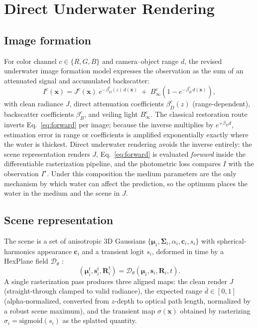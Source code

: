 \documentclass[11pt,a4paper]{article}
\newcommand{\Binf}{B_\infty}
\newcommand{\J}{J}
\newcommand{\I}{I}
\begin{document}
\section{Direct Underwater Rendering}
\label{sec:dur}

\subsection{Image formation}

For color channel $c \in \{R,G,B\}$ and camera--object range $d$, the revised underwater image formation model \cite{akkaynak2018revised} expresses the observation as the sum of an attenuated signal and accumulated backscatter:
\begin{equation}
    \I^c(\mathbf{x})
    =
    \J^c(\mathbf{x})\; e^{-\beta_D^c(z)\, d(\mathbf{x})}
    \;+\;
    \Binf^c \left(1-e^{-\beta_B^c\, d(\mathbf{x})}\right),
    \label{eq:forward}
\end{equation}
with clean radiance $\J$, direct attenuation coefficients $\beta_D^c(z)$ (range-dependent), backscatter coefficients $\beta_B^c$, and veiling light $\Binf^c$. The classical restoration route inverts Eq.~\eqref{eq:forward} per image; because the inverse multiplies by $e^{+\beta_D d}$, estimation error in range or coefficients is amplified exponentially exactly where the water is thickest. Direct underwater rendering avoids the inverse entirely: the scene representation renders $\J$, Eq.~\eqref{eq:forward} is evaluated \emph{forward} inside the differentiable rasterization pipeline, and the photometric loss compares $\I$ with the observation $\I^\star$. Under this composition the medium parameters are the only mechanism by which water can affect the prediction, so the optimum places the water in the medium and the scene in $\J$.

\subsection{Scene representation}

The scene is a set of anisotropic 3D Gaussians $\{\boldsymbol{\mu}_i, \boldsymbol{\Sigma}_i, \alpha_i, \mathbf{c}_i, s_i\}$ with spherical-harmonics appearance $\mathbf{c}_i$ \cite{kerbl20233d} and a transient logit $s_i$, deformed in time by a HexPlane field $\mathcal{D}_\theta$ \cite{cao2023hexplane,wu20244d}:
\begin{equation}
    (\boldsymbol{\mu}_i^t, \mathbf{s}_i^t, \mathbf{R}_i^t) = \mathcal{D}_\theta(\boldsymbol{\mu}_i, \mathbf{s}_i, \mathbf{R}_i, t).
\end{equation}
A single rasterization pass produces three aligned maps: the clean render $\J$ (straight-through clamped to valid radiance), the expected range $\bar d \in [0,1]$ (alpha-normalized, converted from $z$-depth to optical path length, normalized by a robust scene maximum), and the transient map $\sigma(\mathbf{x})$ obtained by rasterizing $\sigma_i = \mathrm{sigmoid}(s_i)$ as the splatted quantity.
\end{document}
